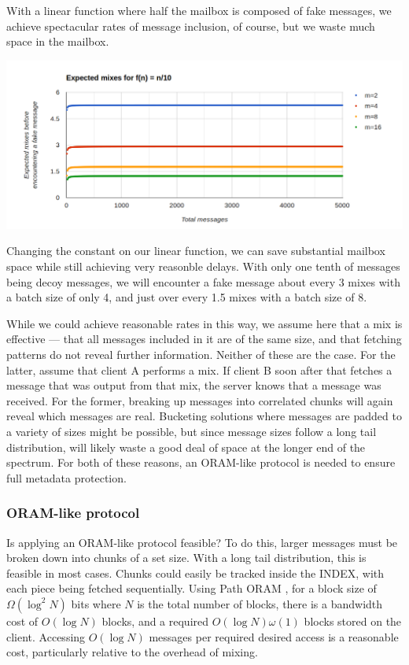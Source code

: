 \documentclass[pageno]{jpaper}
\begin{document}
With a linear function where half the mailbox is composed of fake messages, we achieve spectacular rates of message inclusion, of course, but we waste much space in the mailbox.

\includegraphics[width=\textwidth]{nover10}

Changing the constant on our linear function, we can save substantial mailbox space while still achieving very reasonble delays. With only one tenth of messages being decoy messages, we will encounter a fake message about every 3 mixes with a batch size of only 4, and just over every 1.5 mixes with a batch size of 8.

While we could achieve reasonable rates in this way, we assume here that a mix is effective \---- that all messages included in it are of the same size, and that fetching patterns do not reveal further information. Neither of these are the case. For the latter, assume that client A performs a mix. If client B soon after that fetches a message that was output from that mix, the server knows that a message was received. For the former, breaking up messages into correlated chunks will again reveal which messages are real. Bucketing solutions where messages are padded to a variety of sizes might be possible, but since message sizes follow a long tail distribution, will likely waste a good deal of space at the longer end of the spectrum. For both of these reasons, an ORAM-like protocol is needed to ensure full metadata protection.


\subsubsection{ORAM-like protocol}

Is applying an ORAM-like protocol feasible? To do this, larger messages must be broken down into chunks of a set size. With a long tail distribution, this is feasible in most cases. Chunks could easily be tracked inside the INDEX, with each piece being fetched sequentially. Using Path ORAM \cite{stefanov2013path}, for a block size of $\Omega (\log ^2 N)$ bits where $N$ is the total number of blocks, there is a bandwidth cost of $O(\log N)$ blocks, and a required $O(\log N)\omega(1)$ blocks stored on the client. Accessing $O(\log N)$ messages per required desired access is a reasonable cost, particularly relative to the overhead of mixing.
\end{document}
